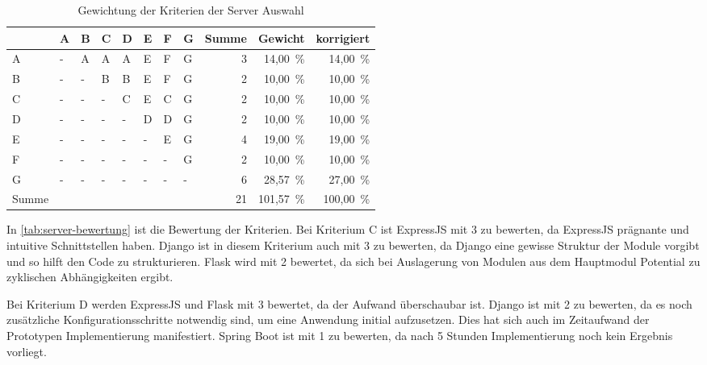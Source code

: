 \begin{table}[h]
	\caption{Gewichtung der Kriterien der Server Auswahl}
	\begin{center}
		\begin{tabular}{llllllllrrr}
			\toprule
			      & A & B & C & D & E & F & G & \multicolumn{1}{l}{Summe} & \multicolumn{1}{l}{Gewicht} & \multicolumn{1}{l}{korrigiert} \\ \midrule
			A     & - & A & A & A & E & F & G &                         3 &                    14,00 \% &                       14,00 \% \\
			B     & - & - & B & B & E & F & G &                         2 &                    10,00 \% &                       10,00 \% \\
			C     & - & - & - & C & E & C & G &                         2 &                    10,00 \% &                       10,00 \% \\
			D     & - & - & - & - & D & D & G &                         2 &                    10,00 \% &                       10,00 \% \\
			E     & - & - & - & - & - & E & G &                         4 &                    19,00 \% &                       19,00 \% \\
			F     & - & - & - & - & - & - & G &                         2 &                    10,00 \% &                       10,00 \% \\
			G     & - & - & - & - & - & - & - &                         6 &                    28,57 \% &                       27,00 \% \\
			Summe &   &   &   &   &   &   &   &                        21 &                   101,57 \% &                      100,00 \% \\ \bottomrule
		\end{tabular}
	\end{center}
	\label{tab:server-gewichtung}
\end{table}

In \autoref{tab:server-bewertung} ist die Bewertung der Kriterien.
Bei Kriterium C ist ExpressJS mit 3 zu bewerten, da ExpressJS prägnante und intuitive Schnittstellen haben. Django ist in diesem Kriterium auch mit 3 zu bewerten, da Django eine gewisse Struktur der Module vorgibt und so hilft den Code zu strukturieren.
Flask wird mit 2 bewertet, da sich bei Auslagerung von Modulen aus dem Hauptmodul Potential zu zyklischen Abhängigkeiten ergibt.

Bei Kriterium D werden ExpressJS und Flask mit 3 bewertet, da der Aufwand überschaubar ist.
Django ist mit 2 zu bewerten, da es noch zusätzliche Konfigurationsschritte notwendig sind, um eine Anwendung initial aufzusetzen. Dies hat sich auch im Zeitaufwand der Prototypen Implementierung manifestiert.
Spring Boot ist mit 1 zu bewerten, da nach 5 Stunden Implementierung noch kein Ergebnis vorliegt.

